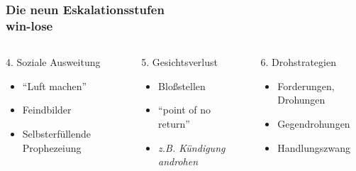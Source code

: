 \documentclass[
	ngerman,
	xcolor=dvipsnames,
	11pt
	]{beamer}
\begin{document}
\begin{frame}
	\frametitle{Die neun Eskalationsstufen\\win-lose}
\begin{columns}[t]
	\begin{column}{0.33\textwidth}
		\begin{block}{4. Soziale Ausweitung}
			\begin{itemize}
				\item ``Luft machen''
				\item Feindbilder
				\item Selbsterfüllende Prophezeiung
			\end{itemize}
		\end{block}
	\end{column}
	\pause
	\begin{column}{0.33\textwidth}
		\begin{block}{5. Gesichtsverlust}
			\begin{itemize}
				\item Bloßstellen
				\item ``point of no return''
				\item \it z.B. Kündigung androhen
			\end{itemize}
		\end{block}
	\end{column}
	\pause
	\begin{column}{0.33\textwidth}
		\begin{block}{6. Drohstrategien}
			\begin{itemize}
				\item Forderungen, Drohungen
				\item Gegendrohungen
				\item Handlungszwang
			\end{itemize}
		\end{block}
	\end{column}
\end{columns}
\end{frame}
\end{document}
